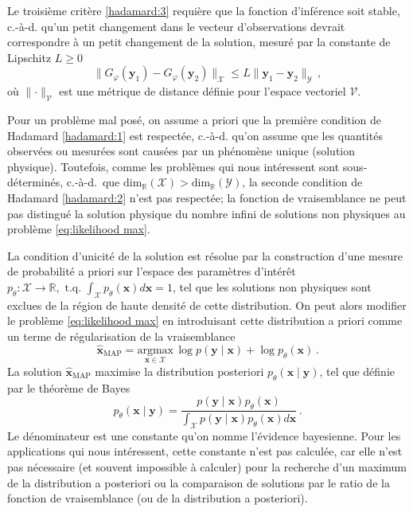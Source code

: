 Le troisième critère \ref{hadamard:3} requière que la fonction d'inférence soit stable, c.-à-d. qu'un petit changement 
dans le vecteur d'observations devrait correspondre à un petit changement de la solution, mesuré par la constante de Lipschitz
$L \geq 0$
\begin{equation}\label{eq:Lipschitz}
        \lVert G_\varphi(\mathbf{y}_1) - G_\varphi(\mathbf{y}_2)\rVert_{\mathcal{X}} \leq L \lVert \mathbf{y}_1 - \mathbf{y}_2\rVert_{\mathcal{Y}}\, ,
\end{equation}
où $\lVert \cdot \rVert_{\mathcal{V}}$ est une métrique de distance définie pour l'espace vectoriel $\mathcal{V}$.

Pour un problème mal posé,
on assume a priori que la première condition de Hadamard \ref{hadamard:1} est respectée, c.-à-d. qu'on assume 
que les quantités observées ou mesurées sont causées par un phénomène unique (solution physique). 
Toutefois, comme les problèmes qui nous intéressent sont sous-déterminés, 
c.-à-d.\ que $\mathrm{dim}_{\mathbb{R}}(\mathcal{X}) > \mathrm{dim}_{\mathbb{R}}(\mathcal{Y})$,
la seconde condition de Hadamard \ref{hadamard:2} n'est pas respectée; la fonction de vraisemblance 
ne peut pas distingué la solution physique du nombre infini de solutions non physiques au problème \eqref{eq:likelihood max}.

La condition d'unicité de la solution est résolue par la construction d'une
mesure de probabilité a priori sur l'espace des paramètres d'intérêt 
$p_\theta: \mathcal{X} \rightarrow \mathbb{R}, \,\, \mathrm{t.q.}\,\, \int_{\mathcal{X}} p_\theta(\mathbf{x}) d\mathbf{x} = 1$,
tel que les solutions non physiques sont exclues de la région de haute densité de cette distribution.
On peut alors modifier le problème \eqref{eq:likelihood max} en introduisant cette distribution 
a priori comme un terme de régularisation de la vraisemblance
\begin{equation}\label{eq:MAP intro}
        \hat{\mathbf{x}}_{\mathrm{MAP}} = \underset{\mathbf{x} \in \mathcal{X}}{\mathrm{argmax}}\, \log p(\mathbf{y} \mid \mathbf{x}) + \log p_\theta(\mathbf{x})\, .
\end{equation} 
La solution $\hat{\mathbf{x}}_{\mathrm{MAP}}$ maximise la distribution posteriori $p_\theta(\mathbf{x} \mid \mathbf{y})$, 
tel que définie par le théorème de Bayes
\begin{equation}\label{eq:Bayes}
        p_\theta(\mathbf{x} \mid \mathbf{y}) = \frac{p(\mathbf{y} \mid \mathbf{x}) p_\theta(\mathbf{x})}{\int_{\mathcal{X}} p(\mathbf{\mathbf{y}} \mid \mathbf{x}) p_\theta(\mathbf{x}) d\mathbf{x}}\, .
\end{equation} 
Le dénominateur est une constante qu'on nomme l'évidence bayesienne. 
Pour les applications qui nous intéressent, cette constante n'est pas calculée, 
car elle n'est pas nécessaire (et souvent impossible à calculer) 
pour la recherche d'un maximum de la distribution a posteriori ou 
la comparaison de solutions par le ratio de la fonction de vraisemblance (ou de la distribution a posteriori).

